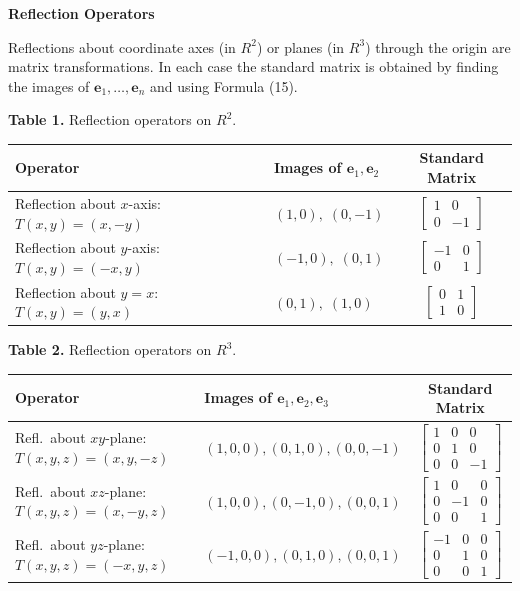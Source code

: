 \documentclass{article}
\newcommand{\redheading}[1]{{\vspace{2mm}\noindent\Large\bfseries\color{red!55!black} #1\par}\vspace{2mm}}
\theoremstyle{mystyle}
\begin{document}
\redheading{Reflection Operators}

Reflections about coordinate axes (in $R^2$) or planes (in $R^3$) through the origin are matrix transformations. In each case the standard matrix is obtained by finding the images of $\mathbf{e}_1,\ldots,\mathbf{e}_n$ and using Formula (15).

\vspace{3mm}
\noindent\textbf{Table 1.} Reflection operators on $R^2$.
\renewcommand{\arraystretch}{1.6}
\begin{center}
\begin{tabular}{|l|l|c|}
\hline
\textbf{Operator} & \textbf{Images of $\mathbf{e}_1,\mathbf{e}_2$} & \textbf{Standard Matrix} \\
\hline
Reflection about $x$-axis: $T(x,y)=(x,-y)$ & $(1,0),\;(0,-1)$ & $\begin{bmatrix}1&0\\0&-1\end{bmatrix}$ \\
\hline
Reflection about $y$-axis: $T(x,y)=(-x,y)$ & $(-1,0),\;(0,1)$ & $\begin{bmatrix}-1&0\\0&1\end{bmatrix}$ \\
\hline
Reflection about $y=x$: $T(x,y)=(y,x)$ & $(0,1),\;(1,0)$ & $\begin{bmatrix}0&1\\1&0\end{bmatrix}$ \\
\hline
\end{tabular}
\end{center}

\vspace{3mm}
\noindent\textbf{Table 2.} Reflection operators on $R^3$.
\begin{center}
\begin{tabular}{|l|l|c|}
\hline
\textbf{Operator} & \textbf{Images of $\mathbf{e}_1,\mathbf{e}_2,\mathbf{e}_3$} & \textbf{Standard Matrix} \\
\hline
Refl.\ about $xy$-plane: $T(x,y,z)=(x,y,-z)$ & $(1,0,0),(0,1,0),(0,0,-1)$ & $\begin{bmatrix}1&0&0\\0&1&0\\0&0&-1\end{bmatrix}$ \\
\hline
Refl.\ about $xz$-plane: $T(x,y,z)=(x,-y,z)$ & $(1,0,0),(0,-1,0),(0,0,1)$ & $\begin{bmatrix}1&0&0\\0&-1&0\\0&0&1\end{bmatrix}$ \\
\hline
Refl.\ about $yz$-plane: $T(x,y,z)=(-x,y,z)$ & $(-1,0,0),(0,1,0),(0,0,1)$ & $\begin{bmatrix}-1&0&0\\0&1&0\\0&0&1\end{bmatrix}$ \\
\hline
\end{tabular}
\end{center}
\renewcommand{\arraystretch}{1}
\end{document}
